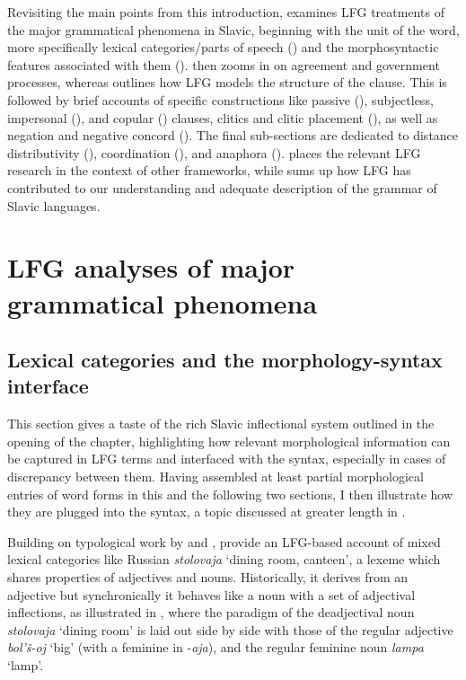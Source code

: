 \documentclass[output=paper,hidelinks]{langscibook}
\begin{document}
\bigskip

Revisiting the main points from this introduction,  examines LFG treatments of the major grammatical phenomena in Slavic, beginning with the unit of the word, more specifically lexical categories/parts of speech () and the morphosyntactic features associated with them ().  then zooms in on agreement and government processes, whereas  outlines how LFG models the structure of the clause. This is followed by brief accounts of specific constructions like passive (), subjectless, impersonal (), and copular () clauses, clitics and clitic placement (), as well as negation and negative concord (). The final sub-sections are dedicated to distance distributivity (), coordination (), and anaphora ().  places the relevant LFG research in the context of other frameworks, while  sums up how LFG has contributed to our understanding and adequate description of the grammar of Slavic languages.

\section{LFG analyses of major grammatical phenomena}
\label{sec:Slavic:2}

\subsection{Lexical categories and the morphology-syntax interface}
\label{sec:Slavic:2.1}

This section gives a taste of the rich Slavic inflectional system outlined in the opening of the chapter, highlighting how relevant morphological information can be captured in LFG terms and interfaced with the syntax, especially in cases of discrepancy between them. Having assembled at least partial morphological entries of word forms in this and the following two sections, I then illustrate how they are plugged into the syntax, a topic discussed at greater length in .

Building on typological work by \citet{BaermanBrownCorbett2015} and \citet[122--123]{spencer13}, \citet[451--453]{DLM:LFG} provide an LFG-based account of mixed lexical categories like Russian \textit{stolovaja} `dining room, canteen', a lexeme which shares properties of adjectives and nouns. Historically, it derives from an adjective but synchronically it behaves like a noun with a set of adjectival inflections, as illustrated in , where the paradigm of the deadjectival noun \textit{stolovaja} `dining room' is laid out side by side with those of the regular adjective \textit{bol'š-oj} `big' (with a feminine in -\textit{aja}), and the regular feminine noun \textit{lampa} `lamp'.
\end{document}
